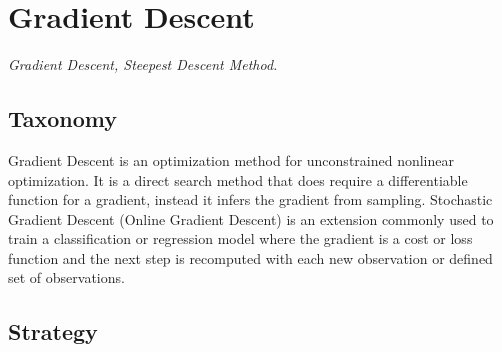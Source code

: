 
\section{Gradient Descent} 
\label{sec:gradient_descent}

\emph{Gradient Descent, Steepest Descent Method.}

\subsection{Taxonomy}
Gradient Descent is an optimization method for unconstrained nonlinear optimization.
It is a direct search method that does require a differentiable function for a gradient, instead it infers the gradient from sampling.
Stochastic Gradient Descent (Online Gradient Descent) is an extension commonly used to train a classification or regression model where the gradient is a cost or loss function and the next step is recomputed with each new observation or defined set of observations.

\subsection{Strategy}


